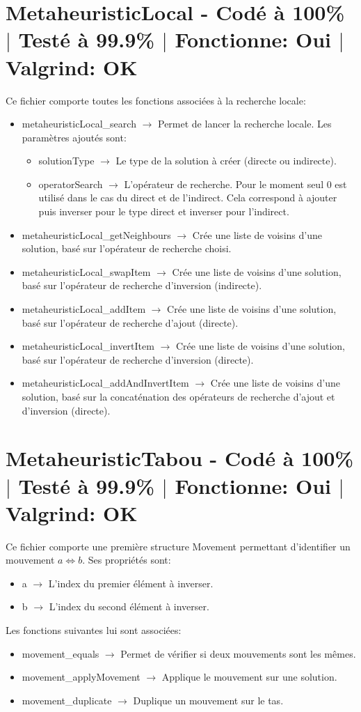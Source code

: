 \documentclass{EPUProjetPeiP}
\newcommand{\comp}[5]{
	\section[#1]{#1 {\small - Codé à #2\% $\vert$ Testé à #3\% $\vert$ Fonctionne: #4 $\vert$ Valgrind: #5}}
}
\begin{document}
\comp{MetaheuristicLocal}{100}{99.9}{Oui}{OK}
Ce fichier comporte toutes les fonctions associées à la recherche locale:
\begin{itemize}
	\item metaheuristicLocal\_search $\longrightarrow$ Permet de lancer la recherche locale. Les paramètres ajoutés sont:
	\begin{itemize}
		\item solutionType $\longrightarrow$ Le type de la solution à créer (directe ou indirecte).
		\item operatorSearch $\longrightarrow$ L'opérateur de recherche. Pour le moment seul 0 est utilisé dans le cas du direct et de l'indirect. Cela correspond à ajouter puis inverser pour le type direct et inverser pour l'indirect.
	\end{itemize}
	\item metaheuristicLocal\_getNeighbours $\longrightarrow$ Crée une liste de voisins d'une solution, basé sur l'opérateur de recherche choisi.
	\item metaheuristicLocal\_swapItem $\longrightarrow$ Crée une liste de voisins d'une solution, basé sur l'opérateur de recherche d'inversion (indirecte).
	\item metaheuristicLocal\_addItem $\longrightarrow$ Crée une liste de voisins d'une solution, basé sur l'opérateur de recherche d'ajout (directe).
	\item metaheuristicLocal\_invertItem $\longrightarrow$ Crée une liste de voisins d'une solution, basé sur l'opérateur de recherche d'inversion (directe).
	\item metaheuristicLocal\_addAndInvertItem $\longrightarrow$ Crée une liste de voisins d'une solution, basé sur la concaténation des opérateurs de recherche d'ajout et d'inversion (directe).
\end{itemize}

\comp{MetaheuristicTabou}{100}{99.9}{Oui}{OK}
Ce fichier comporte une première structure Movement permettant d'identifier un mouvement $a\Leftrightarrow b$. Ses propriétés sont:
\begin{itemize}
	\item a $\longrightarrow$ L'index du premier élément à inverser.
	\item b $\longrightarrow$ L'index du second élément à inverser.\\
\end{itemize}

Les fonctions suivantes lui sont associées:
\begin{itemize}
	\item movement\_equals $\longrightarrow$ Permet de vérifier si deux mouvements sont les mêmes.
	\item movement\_applyMovement $\longrightarrow$ Applique le mouvement sur une solution.
	\item movement\_duplicate $\longrightarrow$ Duplique un mouvement sur le tas.\\
\end{itemize}
\end{document}
